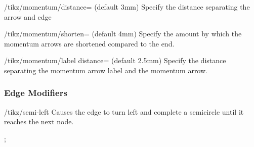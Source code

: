 \documentclass[a4paper,final]{ltxdoc}
\begin{document}
\begin{key}{/tikz/momentum/distance= (default 3mm)}
  Specify the distance separating the arrow and edge

\begin{codeexample}[]
 \end{codeexample}
\end{key}

\begin{key}{/tikz/momentum/shorten= (default 4mm)}
  Specify the amount by which the momentum arrows are shortened compared to the
  end.

\begin{codeexample}[]
 \end{codeexample}
\end{key}

\begin{key}{/tikz/momentum/label distance= (default 2.5mm)}
  Specify the distance separating the momentum arrow label and the momentum
  arrow.

\begin{codeexample}[]
 \end{codeexample}
\end{key}



\subsubsection{Edge Modifiers}
\label{subsubsec:edge_modifiers}

\begin{key}{/tikz/semi-left}
  Causes the edge to turn left and complete a semicircle until it reaches the
  next node.

\begin{codeexample}[]
\tikz {};
\end{codeexample}
\end{key}
\end{document}
